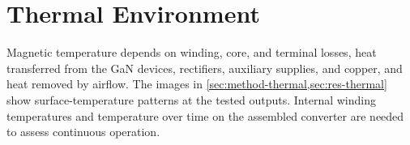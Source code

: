 \section{Thermal Environment}
\label{sec:mag-thermal}

Magnetic temperature depends on winding, core, and terminal losses, heat transferred from the GaN devices, rectifiers, auxiliary supplies, and copper, and heat removed by airflow. The images in \cref{sec:method-thermal,sec:res-thermal} show surface-temperature patterns at the tested outputs. Internal winding temperatures and temperature over time on the assembled converter are needed to assess continuous operation.
